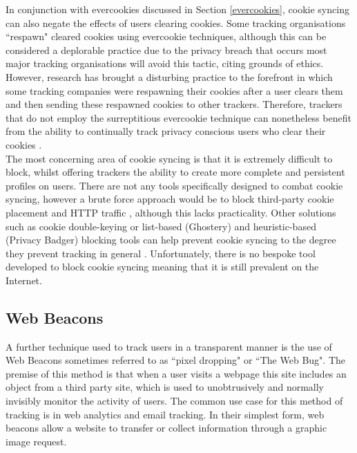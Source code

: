 \documentclass[12pt]{article}
\begin{document}
In conjunction with evercookies discussed in Section \ref{evercookies}, cookie syncing can also negate the effects of users clearing cookies. Some tracking organisations ``respawn" cleared cookies using evercookie techniques, although this can be considered a deplorable practice due to the privacy breach  that occurs most major tracking organisations will avoid this tactic, citing grounds of ethics. However, research has brought a disturbing practice to the forefront in which some tracking companies were respawning their cookies after a user clears them and then sending these respawned cookies to other trackers. Therefore, trackers that do not employ the surreptitious evercookie technique can nonetheless benefit from the ability to continually track privacy conscious users who clear their cookies \parencite{cookieSync}. \\

The most concerning area of cookie syncing is that it is extremely difficult to block, whilst offering trackers the ability to create more complete and persistent profiles on users. There are not any tools specifically designed to combat cookie syncing, however a brute force approach would be to block third-party cookie placement and HTTP traffic \parencite{webNeverForgets}, although this lacks practicality. Other solutions such as cookie double-keying or list-based (Ghostery) and heuristic-based (Privacy Badger) blocking tools can help prevent cookie syncing to the degree they prevent tracking in general \parencite{cookieSync}. Unfortunately, there is no bespoke tool developed to block cookie syncing meaning that it is still prevalent on the Internet.

\subsection{Web Beacons}
A further technique used to track users in a transparent manner is the use of Web Beacons sometimes referred to as ``pixel dropping" or ``The Web Bug". The premise of this method is that when a user visits a webpage this site includes an object from a third party site, which is used to unobtrusively and normally invisibly monitor the activity of users. The common use case for this method of tracking is in web analytics and email tracking. In their simplest form, web beacons allow a website to transfer or collect information through a graphic image request. \\ 
\end{document}
